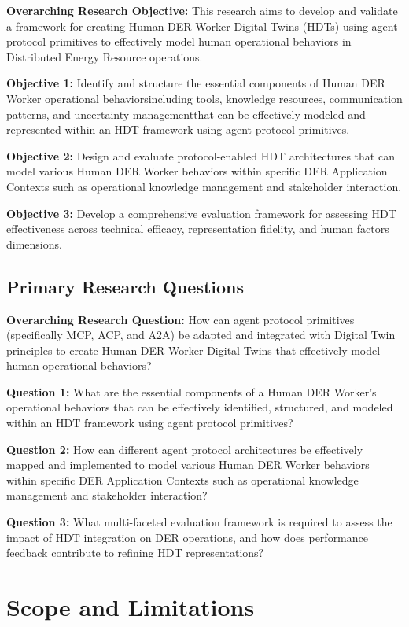 \documentclass[12pt,a4paper]{article}
\newcommand{\emdash}{\textemdash}
\begin{document}
\textbf{Overarching Research Objective:} This research aims to develop and validate a framework for creating Human DER Worker Digital Twins (HDTs) using agent protocol primitives to effectively model human operational behaviors in Distributed Energy Resource operations.

\textbf{Objective 1:} Identify and structure the essential components of Human DER Worker operational behaviors\emdash{}including tools, knowledge resources, communication patterns, and uncertainty management\emdash{}that can be effectively modeled and represented within an HDT framework using agent protocol primitives.

\textbf{Objective 2:} Design and evaluate protocol-enabled HDT architectures that can model various Human DER Worker behaviors within specific DER Application Contexts such as operational knowledge management and stakeholder interaction.

\textbf{Objective 3:} Develop a comprehensive evaluation framework for assessing HDT effectiveness across technical efficacy, representation fidelity, and human factors dimensions.

\subsection{Primary Research Questions}

\textbf{Overarching Research Question:} How can agent protocol primitives (specifically MCP, ACP, and A2A) be adapted and integrated with Digital Twin principles to create Human DER Worker Digital Twins that effectively model human operational behaviors?

\textbf{Question 1:} What are the essential components of a Human DER Worker's operational behaviors that can be effectively identified, structured, and modeled within an HDT framework using agent protocol primitives?

\textbf{Question 2:} How can different agent protocol architectures be effectively mapped and implemented to model various Human DER Worker behaviors within specific DER Application Contexts such as operational knowledge management and stakeholder interaction?

\textbf{Question 3:} What multi-faceted evaluation framework is required to assess the impact of HDT integration on DER operations, and how does performance feedback contribute to refining HDT representations?

\section{Scope and Limitations}
\label{sec:scope}
\end{document}
